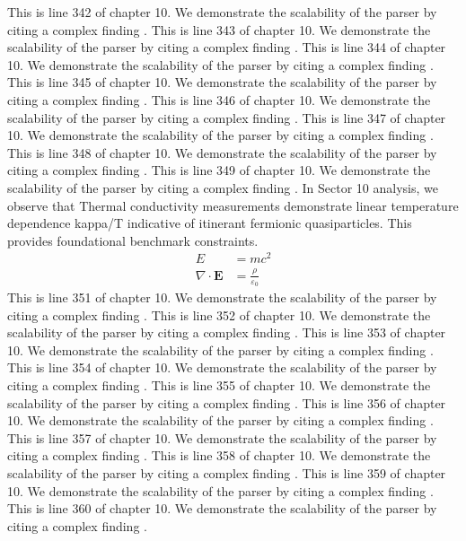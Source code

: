 This is line 342 of chapter 10. We demonstrate the scalability of the parser by citing a complex finding \cite{ref10_342}.
This is line 343 of chapter 10. We demonstrate the scalability of the parser by citing a complex finding \cite{ref10_343}.
This is line 344 of chapter 10. We demonstrate the scalability of the parser by citing a complex finding \cite{ref10_344}.
This is line 345 of chapter 10. We demonstrate the scalability of the parser by citing a complex finding \cite{ref10_345}.
This is line 346 of chapter 10. We demonstrate the scalability of the parser by citing a complex finding \cite{ref10_346}.
This is line 347 of chapter 10. We demonstrate the scalability of the parser by citing a complex finding \cite{ref10_347}.
This is line 348 of chapter 10. We demonstrate the scalability of the parser by citing a complex finding \cite{ref10_348}.
This is line 349 of chapter 10. We demonstrate the scalability of the parser by citing a complex finding \cite{ref10_349}.
In Sector 10 analysis, we observe that Thermal conductivity measurements demonstrate linear temperature dependence kappa/T indicative of itinerant fermionic quasiparticles. This provides foundational benchmark constraints.
\begin{align*}
  E &= mc^2 \\
  \nabla \cdot \mathbf{E} &= \frac{\rho}{\varepsilon_0}
\end{align*}
This is line 351 of chapter 10. We demonstrate the scalability of the parser by citing a complex finding \cite{ref10_351}.
This is line 352 of chapter 10. We demonstrate the scalability of the parser by citing a complex finding \cite{ref10_352}.
This is line 353 of chapter 10. We demonstrate the scalability of the parser by citing a complex finding \cite{ref10_353}.
This is line 354 of chapter 10. We demonstrate the scalability of the parser by citing a complex finding \cite{ref10_354}.
This is line 355 of chapter 10. We demonstrate the scalability of the parser by citing a complex finding \cite{ref10_355}.
This is line 356 of chapter 10. We demonstrate the scalability of the parser by citing a complex finding \cite{ref10_356}.
This is line 357 of chapter 10. We demonstrate the scalability of the parser by citing a complex finding \cite{ref10_357}.
This is line 358 of chapter 10. We demonstrate the scalability of the parser by citing a complex finding \cite{ref10_358}.
This is line 359 of chapter 10. We demonstrate the scalability of the parser by citing a complex finding \cite{ref10_359}.
This is line 360 of chapter 10. We demonstrate the scalability of the parser by citing a complex finding \cite{ref10_360}.
